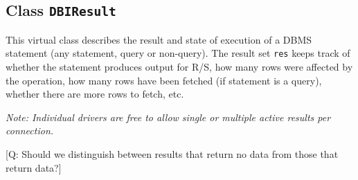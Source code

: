 \documentclass[graphics,times,psfig,dvips,hyper]{article}
\newcommand{\sobj}[1]{\mbox{\tt #1}}    %
\newcommand{\sclass}[1]{\mbox{\tt #1}}  %
\begin{document}
\subsection{Class \sclass{DBIResult}}\label{sec:DBIResult}

This virtual class describes the result and state of execution of
a DBMS statement (any statement, query or non-query).  The result set
\sobj{res} keeps track of whether the statement produces output
for R/S, how many rows were affected by the operation, how many
rows have been fetched (if statement is a query), whether there
are more rows to fetch, etc.  

\emph{Note: Individual drivers are free to allow single or multiple
active results per connection.
}

[Q: Should we distinguish between results that return no data from those
that return data?]
\end{document}
